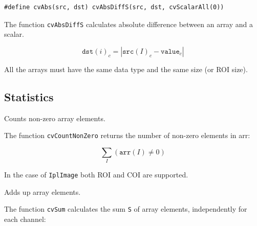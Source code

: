 \begin{lstlisting}
#define cvAbs(src, dst) cvAbsDiffS(src, dst, cvScalarAll(0))
\end{lstlisting}

\begin{description}
\end{description}

The function \texttt{cvAbsDiffS} calculates absolute difference between an array and a scalar.

\[ \texttt{dst}(i)_c = |\texttt{src}(I)_c - \texttt{value}_c| \]

All the arrays must have the same data type and the same size (or ROI size).

\subsection{Statistics}

\label{CountNonZero}

Counts non-zero array elements.


\begin{description}
\end{description}


The function \texttt{cvCountNonZero} returns the number of non-zero elements in arr:

\[ \sum_I (\texttt{arr}(I) \ne 0) \]

In the case of \texttt{IplImage} both ROI and COI are supported.


\label{Sum}

Adds up array elements.


\begin{description}
\end{description}


The function \texttt{cvSum} calculates the sum \texttt{S} of array elements, independently for each channel:

